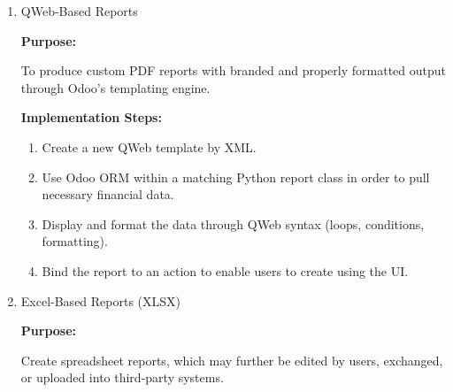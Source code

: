 \documentclass[11pt,a4paper]{article}
\begin{document}
\begin{enumerate}
    \begin{minipage}{0.45\textwidth}
        \begin{enumerate}
            \item QWeb-Based Reports
            
            \textbf{Purpose:} 
            
            To produce custom PDF reports with branded and properly formatted output through Odoo's templating engine.
            \medskip

            \textbf{Implementation Steps:}
            \begin{enumerate}
                \item Create a new QWeb template by XML.
                \item Use Odoo ORM within a matching Python report class in order to pull necessary financial data.
                \item Display and format the data through QWeb syntax (loops, conditions, formatting).
                \item Bind the report to an action to enable users to create using the UI.
            \end{enumerate}
            \item Excel-Based Reports (XLSX)
            
            \textbf{Purpose:} 
            
            Create spreadsheet reports, which may further be edited by users, exchanged, or uploaded into third-party systems.
            \medskip


\end{enumerate}
\end{minipage}
\end{enumerate}
\end{document}
